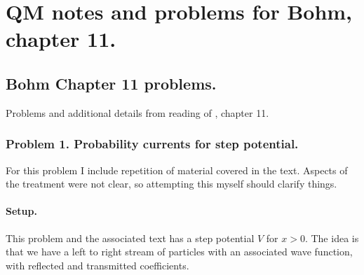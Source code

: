 
%
%




\chapter{QM notes and problems for Bohm, chapter 11. }

%

\section{Bohm Chapter 11 problems. }

Problems and additional details from reading of \cite{bohm1989qt}, chapter 11.

\subsection{Problem 1.  Probability currents for step potential. }

For this problem I include repetition of material covered in the text.
Aspects of the treatment were not clear, so attempting this myself
should clarify things.

\subsubsection{Setup. }

This problem and the associated text has a step potential $V$ for $x>0$.  The
idea is that we have a left to right stream of particles with an associated
wave function, with reflected and transmitted coefficients.

